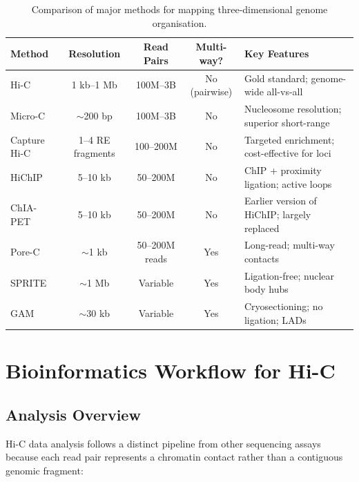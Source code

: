 \begin{table}[htbp]
\centering
\caption[Comparison of 3D genome profiling methods.]{Comparison of major methods for mapping three-dimensional genome organisation.}
\label{tab:3dgenome:comparison}
\small
\begin{tabularx}{\textwidth}{l c c c X}
\toprule
\textbf{Method} & \textbf{Resolution} & \textbf{Read Pairs} & \textbf{Multi-way?} & \textbf{Key Features} \\
\midrule
Hi-C & 1 kb--1 Mb & 100M--3B & No (pairwise) & Gold standard; genome-wide all-vs-all \\
\addlinespace
Micro-C & $\sim$200 bp & 100M--3B & No & Nucleosome resolution; superior short-range \\
\addlinespace
Capture Hi-C & 1--4 RE fragments & 100--200M & No & Targeted enrichment; cost-effective for loci \\
\addlinespace
HiChIP & 5--10 kb & 50--200M & No & ChIP + proximity ligation; active loops \\
\addlinespace
ChIA-PET & 5--10 kb & 50--200M & No & Earlier version of HiChIP; largely replaced \\
\addlinespace
Pore-C & $\sim$1 kb & 50--200M reads & Yes & Long-read; multi-way contacts \\
\addlinespace
SPRITE & $\sim$1 Mb & Variable & Yes & Ligation-free; nuclear body hubs \\
\addlinespace
GAM & $\sim$30 kb & Variable & Yes & Cryosectioning; no ligation; LADs \\
\bottomrule
\end{tabularx}
\end{table}

\section{Bioinformatics Workflow for Hi-C}
\label{sec:3dgenome:bioinformatics}

\subsection{Analysis Overview}
\label{subsec:3dgenome:analysis-overview}

Hi-C data analysis follows a distinct pipeline from other sequencing assays because each read pair represents a chromatin contact rather than a contiguous genomic fragment:

